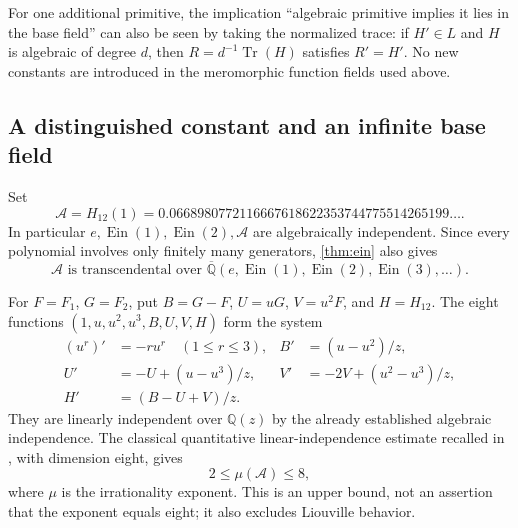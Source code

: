 \documentclass[11pt,a4paper]{article}
\numberwithin{equation}{section}
\theoremstyle{definition}
\theoremstyle{remark}
\newcommand{\Q}{\mathbb Q}
\newcommand{\Qb}{\overline{\mathbb Q}}
\newcommand{\Ein}{\operatorname{Ein}}
\begin{document}
For one additional primitive, the implication ``algebraic primitive implies
it lies in the base field'' can also be seen by taking the normalized trace:
if $H'\in L$ and $H$ is algebraic of degree $d$, then
$R=d^{-1}\operatorname{Tr}(H)$ satisfies $R'=H'$. No new constants are
introduced in the meromorphic function fields used above.

\subsection{A distinguished constant and an infinite base field}
Set
\begin{equation}
 \mathcal A=H_{12}(1)
 =0.0668980772116667618622353744775514265199\ldots.
\end{equation}
In particular $e,\Ein(1),\Ein(2),\mathcal A$ are algebraically independent.
Since every polynomial involves only finitely many generators,
\cref{thm:ein} also gives
\begin{equation}
 \mathcal A\text{ is transcendental over }
 \Qb(e,\Ein(1),\Ein(2),\Ein(3),\ldots).
\end{equation}

For $F=F_1$, $G=F_2$, put $B=G-F$, $U=uG$, $V=u^2F$, and $H=H_{12}$.
The eight functions $(1,u,u^2,u^3,B,U,V,H)$ form the system
\begin{align}
 (u^r)'&=-ru^r\quad(1\le r\le3), & B'&=(u-u^2)/z,\\
 U'&=-U+(u-u^3)/z, & V'&=-2V+(u^2-u^3)/z,\\
 H'&=(B-U+V)/z. &&
\end{align}
They are linearly independent over $\Q(z)$ by the already established
algebraic independence. The classical quantitative linear-independence
estimate recalled in \cite{FRLiouville}, with dimension eight, gives
\begin{equation}
 2\le\mu(\mathcal A)\le8,
\end{equation}
where $\mu$ is the irrationality exponent. This is an upper bound, not an
assertion that the exponent equals eight; it also excludes Liouville behavior.
\end{document}
